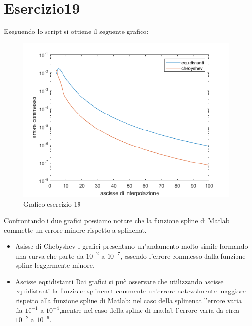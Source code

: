 \section{Esercizio19}

Eseguendo lo script si ottiene il seguente grafico:
\begin{figure}[h]
    \includegraphics[scale=0.8]{CodiceMatlab/Esercizio15-19/graficoEs19.png}
    \caption{Grafico esercizio 19}
    \label{fig:es19}    
\end{figure}

Confrontando i due grafici possiamo notare che la funzione spline di Matlab commette un errore minore rispetto a splinenat. 
\begin{itemize}
\item Asisse di Chebyshev
 I grafici presentano un'andamento molto simile formando una curva che parte da $10^{-2}$ a $10^{-7}$, essendo l'errore commesso dalla funzione spline leggermente minore.
\item Ascisse equidistanti
Dai grafici si può osservare che utilizzando ascisse equidistanti la funzione splinenat commente un'errore notevolmente maggiore rispetto alla funzione spline di Matlab: nel caso della splinenat l'errore varia da $10^{-1}$ a $10^{-4}$,mentre nel caso della spline di matlab l'errore varia da circa $10^{-2}$ a $10^{-6}$.
\end{itemize}